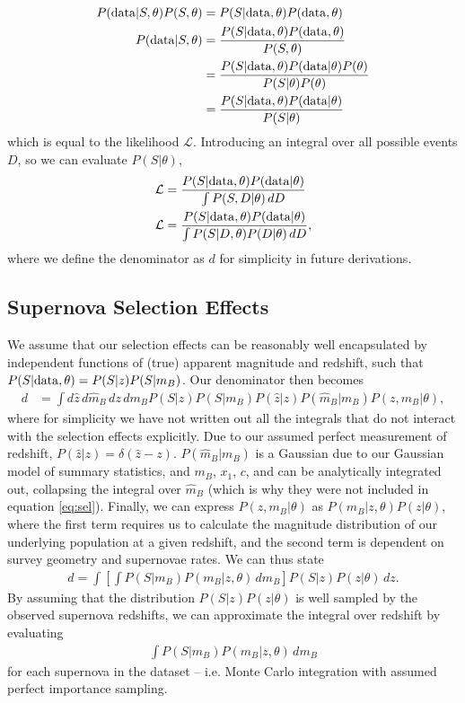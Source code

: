 \documentclass[a4paper,fleqn,usenatbib]{mnras}
\begin{document}
\begin{align}
P({\rm data} | S , \theta) P(S, \theta) &= P(S | {\rm data}, \theta) P({\rm data}, \theta)\\
P({\rm data} | S , \theta) &= \frac{ P(S | {\rm data}, \theta) P({\rm data}, \theta) }{ P(S, \theta) }\\
&= \frac{ P(S | {\rm data}, \theta) P({\rm data} | \theta) P(\theta)}{ P(S | \theta)  P(\theta)}\\
&= \frac{ P(S | {\rm data}, \theta) P({\rm data} | \theta)}{ P(S | \theta) }
\end{align}
which is equal to the likelihood $\mathcal{L}$. Introducing an integral over all possible events $D$, so we can evaluate $P(S|\theta)$, 
\begin{align}
\mathcal{L}&= \frac{P(S|{\rm data},\theta) P({\rm data}|\theta)}{\int P(S, D|\theta)\, dD} \\
\mathcal{L} &= \frac{P(S|{\rm data},\theta) P({\rm data}|\theta)}{\int P(S | D, \theta) P(D|\theta)\, dD}, \label{eq:app_main}
\end{align}
where we define the denominator as $d$ for simplicity in future derivations.



\subsection{Supernova Selection Effects}
\label{app:selection2}
We assume that our selection effects can be reasonably well encapsulated by independent functions of (true) apparent magnitude and redshift, such that $P(S|{\rm data}, \theta) = P(S|z) P(S|m_B)$. Our denominator then becomes
\begin{align}
d &= \int d\hat{z} \, d\hat{m}_B \, dz \, dm_B P(S|z) P(S|m_B) P(\hat{z}|z) P(\hat{m}_B|m_B) P(z, m_B | \theta), \label{eq:sel}
\end{align}
where for simplicity we have not written out all the integrals that do not interact with the selection effects explicitly. Due to our assumed perfect measurement of redshift, $P(\hat{z}|z) = \delta(\hat{z} - z)$. $P(\hat{m}_B | m_B)$ is a Gaussian due to our Gaussian model of summary statistics, and $m_B$, $x_1$, $c$, and can be analytically integrated out, collapsing the integral over $\hat{m}_B$ (which is why they were not included in equation \eqref{eq:sel}). Finally, we can express $P(z, m_B | \theta)$ as  $P(m_B | z, \theta) P(z | \theta)$, where the first term requires us to calculate the magnitude distribution of our underlying population at a given redshift, and the second term is dependent on survey geometry and supernovae rates. We can thus state
\begin{align}
d = \int \left[ \int P(S|m_B) P(m_B | z, \theta)\, dm_B \right] P(S|z)P(z|\theta)\, dz.
\end{align}
By assuming that the distribution $P(S|z)P(z|\theta)$ is well sampled by the observed supernova redshifts, we can approximate the integral over redshift by evaluating
\begin{align}
\int P(S|m_B) P(m_B | z, \theta)\, dm_B \label{eq:selint}
\end{align}
for each supernova in the dataset -- i.e. Monte Carlo integration with assumed perfect importance sampling.
\end{document}

